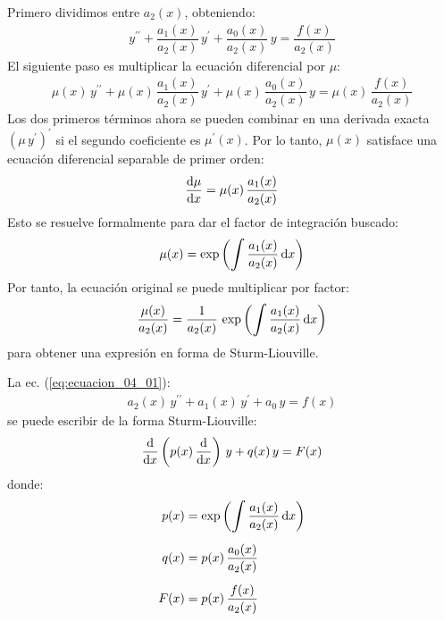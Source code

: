 \documentclass[12pt]{article}
\newcommand{\pderivada}[1]{\ensuremath{{#1}^{\prime}}}
\newcommand{\sderivada}[1]{\ensuremath{{#1}^{\prime \prime}}}
\def\scaleint#1{\vcenter{\hbox{\scaleto[3ex]{\displaystyle\int}{#1}}}}
\numberwithin{equation}{section}
\begin{document}
Primero dividimos entre $a_{2} (x)$, obteniendo:
\begin{align*}
\sderivada{y} + \dfrac{a_{1} (x)}{a_{2} (x)} \, \pderivada{y} + \dfrac{a_{0} (x)}{a_{2} (x)} \, y = \dfrac{f(x)}{a_{2} (x)}
\end{align*} 
El siguiente paso es multiplicar la ecuación diferencial por $\mu$:
\begin{align*}
\mu (x) \, \sderivada{y} + \mu (x) \, \dfrac{a_{1} (x)}{a_{2} (x)} \, \pderivada{y} + \mu (x) \, \dfrac{a_{0} (x)}{a_{2} (x)} \, y = \mu (x) \, \dfrac{f (x)}{a_{2} (x)}
\end{align*}
Los dos primeros términos ahora se pueden combinar en una derivada exacta $( \mu \, \pderivada{y})^{\prime}$  si el segundo coeficiente es $\pderivada{\mu} (x)$. Por lo tanto, $\mu (x)$ satisface una ecuación diferencial separable de primer orden:
\begin{align*}
\dv{\mu}{x} = \mu (x) \, \dfrac{a_{1} (x)}{a_{2} (x)}
\end{align*}
Esto se resuelve formalmente para dar el factor de integración buscado:
\begin{align*}
\mu (x) = \exp \left( \scaleint{6ex} \, \dfrac{a_{1}(x)}{a_{2}(x)} \dd{x} \right)
\end{align*}
Por tanto, la ecuación original se puede multiplicar por factor:
\begin{align*}
\dfrac{\mu (x)}{a_{2} (x)} = \dfrac{1}{a_{2} (x)} \, \exp \left( \scaleint{6ex} \, \dfrac{a_{1} (x)}{a_{2} (x)} \dd{x} \right)
\end{align*}
para obtener una expresión en forma de Sturm-Liouville.
\par
La ec. (\ref{eq:ecuacion_04_01}):
\begin{align*}
a_{2} (x) \, \sderivada{y} + a_{1} (x) \, \pderivada{y} + a_{0} \, y = f(x)
\end{align*}
se puede escribir de la forma Sturm-Liouville:
\begin{align}
\dv{x} \left( p(x) \, \dv{x} \right) \, y + q(x) \, y =  F(x)
\label{eq:ecuacion_04_08}
\end{align}
donde:
\begin{align}
\begin{aligned}
p (x) &= \exp \left( \scaleint{6ex} \, \dfrac{a_{1}(x)}{a_{2}(x)} \dd{x} \right) \\[0.5em]
q (x) &= p(x) \, \dfrac{a_{0}(x)}{a_{2}(x)} \\[0.5em]
F (x) &= p(x) \, \dfrac{f(x)}{a_{2}(x)}
\end{aligned}
\label{eq:ecuacion_04_09}
\end{align}
\end{document}
